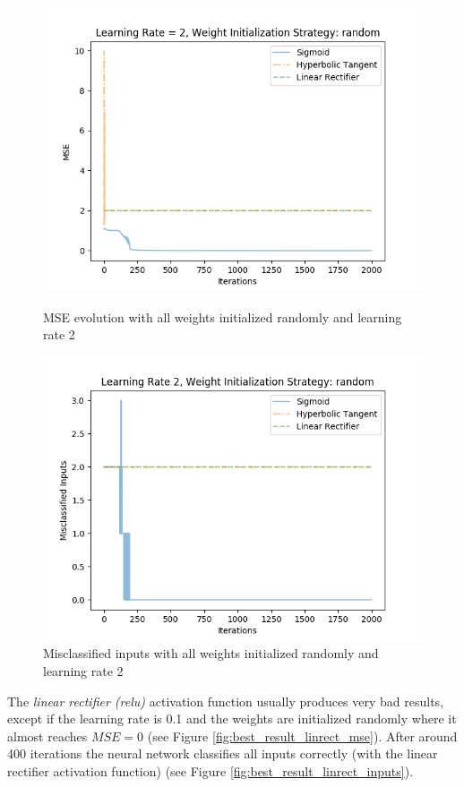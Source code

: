 \documentclass{article}
\begin{document}
\begin{figure}[H]
	\centering
	\includegraphics[width=0.9\linewidth]{img/5/sigmoid-mse.png}
	\caption{MSE evolution with all weights initialized randomly and learning rate 2}
	\label{fig:best_result_sigmoid_mse}
	\centering
	\includegraphics[width=0.9\linewidth]{img/5/sigmoid-inputs.png}
	\caption{Misclassified inputs with all weights initialized randomly and learning rate 2}
	\label{fig:best_result_sigmoid_inputs}
\end{figure}


The \emph{linear rectifier (relu)} activation function usually produces very bad results, except if the learning rate is 0.1 and the weights are initialized randomly where it almost reaches $MSE = 0$ (see Figure \ref{fig:best_result_linrect_mse}). After around 400 iterations the neural network classifies all inputs correctly (with the linear rectifier activation function) (see Figure \ref{fig:best_result_linrect_inputs}).
\end{document}
